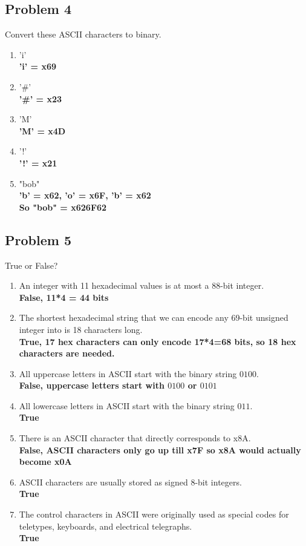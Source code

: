 \documentclass{article}
\begin{document}
\subsection*{Problem 4}
Convert these ASCII characters to binary.
\begin{enumerate}[label=\alph*.]
    \item 'i'\\
    \textbf{'i' = x69}
    \item '\#'\\
    \textbf{'\#' = x23}
    \item 'M'\\
    \textbf{'M' = x4D}
    \item '!'\\
    \textbf{'!' = x21}
    \item "bob"\\
    \textbf{'b' = x62, 'o' = x6F, 'b' = x62\\
            So "bob" = x626F62}
\end{enumerate}

\subsection*{Problem 5}
True or False?
\begin{enumerate}[label=\alph*.]
    \item An integer with 11 hexadecimal values is at most a 88-bit integer.\\
    \textbf{False, 11*4 = 44 bits}
    \item The shortest hexadecimal string that we can encode any 69-bit unsigned integer into is 18 characters long.\\
    \textbf{True, 17 hex characters can only encode 17*4=68 bits, so 18 hex characters are needed.}
    \item All uppercase letters in ASCII start with the binary string $0100$.\\
    \textbf{False, uppercase letters start with $0100$ or $0101$}
    \item All lowercase letters in ASCII start with the binary string $011$.\\
    \textbf{True}
    \item There is an ASCII character that directly corresponds to x8A.\\
    \textbf{False, ASCII characters only go up till x7F so x8A would actually become x0A}
    \item ASCII characters are usually stored as signed 8-bit integers.\\
    \textbf{True}
    \item The control characters in ASCII were originally used as special codes for teletypes, keyboards, and electrical telegraphs.\\
    \textbf{True}
\end{enumerate}
\end{document}
